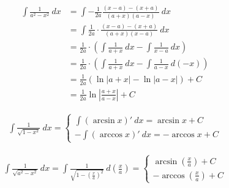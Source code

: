 \begin{align*}
        \int \frac{1}{a^2-x^2}\ dx&=\int -\frac{1}{2a}\frac{(x-a)-(x+a)}{(a+x)(a-x)} \ dx\\
        &=\int \frac{1}{2a}\cdot\frac{(x-a)-(x+a)}{(a+x)(x-a)} \ dx\\
        &=\frac{1}{2a}\cdot\left(\int \frac{1}{a+x} \ dx-\int\frac{1}{x-a} \ dx\right)\\
        &=\frac{1}{2a}\cdot\left(\int \frac{1}{a+x} \ dx-\int\frac{1}{a-x} \ d(-x)\right)\\
        &=\frac{1}{2a}\left(\ln \left|a+x\right|-\ln\left|a-x\right|\right) +C\\
        &=\frac{1}{2a}\ln\left|\frac{a+x}{a-x}\right|+C
\end{align*}

\begin{align*}
        \int \frac{1}{\sqrt{1-x^2}}\ dx=\begin{cases}
                \int (\arcsin x)'\ dx=\arcsin x+C\\
                -\int (\arccos x)'\ dx=-\arccos x+C
        \end{cases}
\end{align*}

\begin{align*}
        \int \frac{1}{\sqrt{a^2-x^2}}\ dx=\int\frac{1}{\sqrt{1-(\frac{x}{a})^2}} \ d(\frac{x}{a})=\begin{cases}
                \arcsin (\frac{x}{a}) +C\\
                -\arccos (\frac{x}{a})+C
        \end{cases}
\end{align*}

